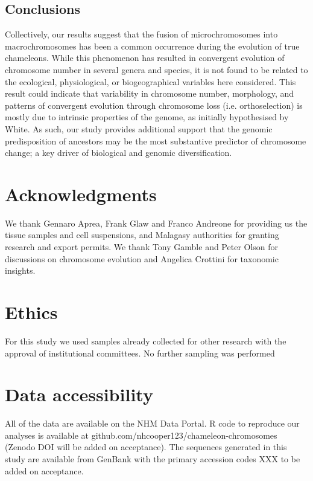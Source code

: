 \documentclass[a4paper, 12pt]{article}
\begin{document}
\subsection{Conclusions}
Collectively, our results suggest that the fusion of microchromosomes into macrochromosomes has been a common occurrence during the evolution of true chameleons. 
While this phenomenon has resulted in convergent evolution of chromosome number in several genera and species, it is not found to be related to the ecological, physiological, or biogeographical variables here considered. 
This result could indicate that variability in chromosome number, morphology, and patterns of convergent evolution through chromosome loss (i.e. orthoselection\cite{white1973}) is mostly due to intrinsic properties of the genome, as initially hypothesised by White\cite{white1975chromosome}. 
As such, our study provides additional support that the genomic predisposition of ancestors may be the most substantive predictor of chromosome change; a key driver of biological and genomic diversification.

\section{Acknowledgments}
We thank Gennaro Aprea, Frank Glaw and Franco Andreone for providing us the tissue samples and cell suspensions, and Malagasy authorities for granting research and export permits. We thank Tony Gamble and Peter Olson for discussions on chromosome evolution and Angelica Crottini for taxonomic insights.

\section{Ethics}
For this study we used samples already collected for other research with the approval of institutional committees. No further sampling was performed

\section{Data accessibility}\label{data-code-and-materials}
All of the data are available on the NHM Data Portal\cite{chameleon-data}. 
R code to reproduce our analyses is available at github.com/nhcooper123/chameleon-chromosomes (Zenodo DOI will be added on acceptance\cite{coopercode2022}). 
The sequences generated in this study are available from GenBank with the primary accession codes XXX to be added on acceptance.
\end{document}
